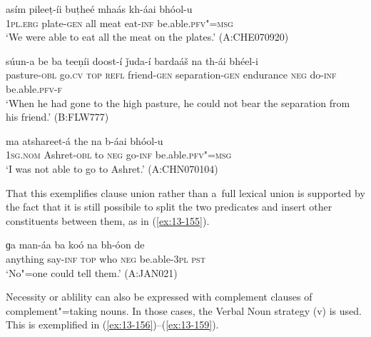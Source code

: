 \begin{exe}
\ex
\label{ex:13-152}
\gll asím pileeṭ-íi buṭheé mhaás kh-áai bhóol-u\\
\textsc{1pl.erg} plate-\textsc{gen} all meat eat-\textsc{inf} be.able.\textsc{pfv"=msg}\\
\glt `We were able to eat all the meat on the plates.' (A:CHE070920)

\ex
\label{ex:13-153}
\gll súun-a be ba teeṇíi doost-í  ǰuda-í bardaáš na th-ái bhéel-i \\
pasture-\textsc{obl} go.\textsc{cv} \textsc{top} \textsc{refl} friend-\textsc{gen} separation-\textsc{gen} endurance \textsc{neg} do-\textsc{inf} be.able.\textsc{pfv-f}  \\
\glt `When he had gone to the high pasture, he could not bear the separation from his friend.' (B:FLW777)

\ex
\label{ex:13-154}
\gll ma atshareet-á the na b-áai bhóol-u  \\
\textsc{1sg.nom} Ashret-\textsc{obl} to \textsc{neg} go-\textsc{inf} be.able.\textsc{pfv"=msg}  \\
\glt `I was not able to go to Ashret.' (A:CHN070104) 
\end{exe}

That this exemplifies clause union rather than a~full lexical union is supported by the fact that it is still possibile to split the two predicates and insert other constituents between them, as in (\ref{ex:13-155}).

\begin{exe}
\ex
\label{ex:13-155}
\gll ɡa man-áa ba koó na bh-óon de  \\
anything say-\textsc{inf} \textsc{top} who \textsc{neg} be.able-\textsc{3pl} \textsc{pst}  \\
\glt `No"=one could tell them.' (A:JAN021) 
\end{exe}

Necessity or ablility can also be expressed with complement clauses of complement"=taking nouns. In those cases, the Verbal Noun strategy (v) is used. This is exemplified in (\ref{ex:13-156})--(\ref{ex:13-159}).

